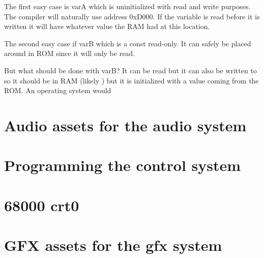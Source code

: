 The first easy case is varA which is uninitialized with read and write purposes. The compiler will naturally use address 0xD000. If the variable is read before it is written it will have whatever value the RAM had at this location. 

The second easy case if varB which is a const read-only. It can safely be placed around  in ROM since it will only be read.

But what should be done with varB? It can be read but it can also be written to so it should be in RAM (likely ) but it is initialized with a value coming from the ROM. An operating system would 

\section{Audio assets for the audio system}

\section{Programming the control system}



\section{68000 crt0}
\pagebreak
{}

\section{GFX assets for the gfx system}

\pagebreak
{}
